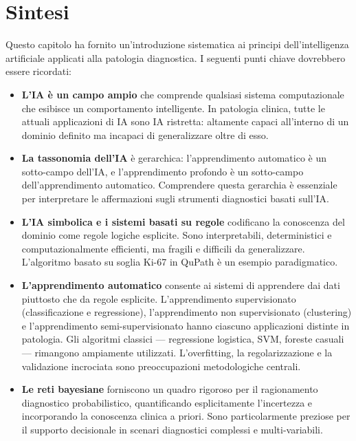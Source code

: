 \section{Sintesi}
\label{sec:ch3_summary}

Questo capitolo ha fornito un'introduzione sistematica ai principi dell'intelligenza artificiale applicati alla patologia diagnostica. I seguenti punti chiave dovrebbero essere ricordati:

\begin{itemize}
    \item \textbf{L'IA è un campo ampio} che comprende qualsiasi sistema computazionale che esibisce un comportamento intelligente. In patologia clinica, tutte le attuali applicazioni di IA sono IA ristretta: altamente capaci all'interno di un dominio definito ma incapaci di generalizzare oltre di esso.

    \item \textbf{La tassonomia dell'IA} è gerarchica: l'apprendimento automatico è un sotto-campo dell'IA, e l'apprendimento profondo è un sotto-campo dell'apprendimento automatico. Comprendere questa gerarchia è essenziale per interpretare le affermazioni sugli strumenti diagnostici basati sull'IA.

    \item \textbf{L'IA simbolica e i sistemi basati su regole} codificano la conoscenza del dominio come regole logiche esplicite. Sono interpretabili, deterministici e computazionalmente efficienti, ma fragili e difficili da generalizzare. L'algoritmo basato su soglia Ki-67 in QuPath è un esempio paradigmatico.

    \item \textbf{L'apprendimento automatico} consente ai sistemi di apprendere dai dati piuttosto che da regole esplicite. L'apprendimento supervisionato (classificazione e regressione), l'apprendimento non supervisionato (clustering) e l'apprendimento semi-supervisionato hanno ciascuno applicazioni distinte in patologia. Gli algoritmi classici — regressione logistica, SVM, foreste casuali — rimangono ampiamente utilizzati. L'overfitting, la regolarizzazione e la validazione incrociata sono preoccupazioni metodologiche centrali.

    \item \textbf{Le reti bayesiane} forniscono un quadro rigoroso per il ragionamento diagnostico probabilistico, quantificando esplicitamente l'incertezza e incorporando la conoscenza clinica a priori. Sono particolarmente preziose per il supporto decisionale in scenari diagnostici complessi e multi-variabili.


\end{itemize}
